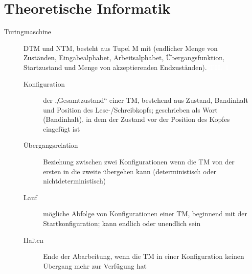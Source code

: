 \documentclass[a4paper,10pt]{article}
\newcommand{\vl}[1]{\colorbox{vl}{\textcolor{white}{\small\textbf{#1}}}}
\begin{document}
    \newpage
    \section{Theoretische Informatik}
    \begin{description}
        \item[Turingmaschine] DTM und NTM, besteht aus Tupel M mit (endlicher Menge von Zuständen, Eingabealphabet, Arbeitsalphabet, Übergangsfunktion, Startzustand und Menge von akzeptierenden Endzuständen). \vl{TIL 1}
            \begin{description}
                \item[Konfiguration]
                    der „Gesamtzustand“ einer TM, bestehend aus Zustand, Bandinhalt und Position des Lese-/Schreibkopfs;
                    geschrieben als Wort (Bandinhalt), in dem der Zustand vor der Position des Kopfes eingefügt ist
                \item[Übergangsrelation]
                    Beziehung zwischen zwei Konfigurationen wenn die TM von der ersten in die zweite übergehen kann
                    (deterministisch oder nichtdeterministisch)
                \item[Lauf]
                    mögliche Abfolge von Konfigurationen einer TM, beginnend mit der Startkonfiguration; kann endlich oder unendlich sein
                \item[Halten]
                    Ende der Abarbeitung, wenn die TM in einer Konfiguration keinen Übergang mehr zur Verfügung hat
            \end{description}
    \end{description}
\end{document}
